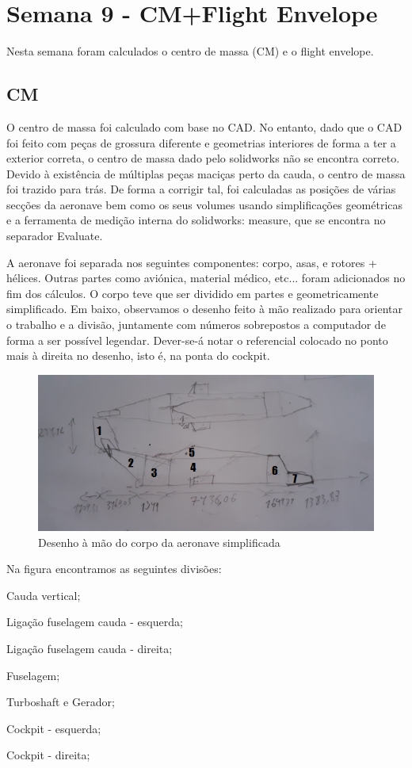 \section{Semana 9 - CM+Flight Envelope}
Nesta semana foram calculados o centro de massa (CM) e o flight envelope.
\subsection{CM}
O centro de massa foi calculado com base no CAD. No entanto, dado que o CAD foi feito com peças de grossura diferente e geometrias interiores de forma a ter a exterior correta, o centro de massa dado pelo solidworks não se encontra correto. Devido à existência de múltiplas peças maciças perto da cauda, o centro de massa foi trazido para trás. De forma a corrigir tal, foi calculadas as posições de várias secções da aeronave bem como os seus volumes usando simplificações geométricas e a ferramenta de medição interna do solidworks: measure, que se encontra no separador Evaluate.\par
A aeronave foi separada nos seguintes componentes: corpo, asas, e rotores + hélices. Outras partes como aviónica, material médico, etc... foram adicionados no fim dos cálculos. O corpo teve que ser dividido em partes e geometricamente simplificado. Em baixo, observamos o desenho feito à mão realizado para orientar o trabalho e a divisão, juntamente com números sobrepostos a computador de forma a ser possível legendar. Dever-se-á notar o referencial colocado no ponto mais à direita no desenho, isto é, na ponta do cockpit.
\FloatBarrier
\begin{figure}[h]
    \centering
    \includegraphics{Imagens/simplificacaoCAD.png}
    \caption{Desenho à mão do corpo da aeronave simplificada}
    \label{draft_aeronave_cad}
\end{figure}
\FloatBarrier
Na figura encontramos as seguintes divisões:
\begin{enumerate*}
    \item Cauda vertical;
    \item Ligação fuselagem cauda - esquerda;
    \item Ligação fuselagem cauda - direita;
    \item Fuselagem;
    \item Turboshaft e Gerador;
    \item Cockpit - esquerda;
    \item Cockpit - direita;
\end{enumerate*}\par
